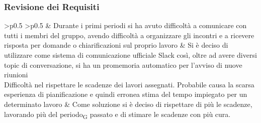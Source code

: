 \subsubsection{Revisione dei Requisiti}
\renewcommand{\arraystretch}{1.5}
\begin{longtable}{
		>{}p{}
		>{}p{}
	}
	\rowcolorhead
	\centering {} &
	\centering \headertitle{Soluzione}
	\endfirsthead
	\endhead
	Durante i primi periodi si ha avuto difficoltà a comunicare con tutti i membri del gruppo, avendo difficoltà a organizzare gli incontri e a ricevere risposta per domande o chiarificazioni sul proprio lavoro & Si è deciso di utilizzare come sistema di comunicazione ufficiale Slack così, oltre ad avere diversi topic di conversazione, si ha un promemoria automatico per l'avviso di nuove riunioni\\
	
	Difficoltà nel rispettare le scadenze dei lavori assegnati. Probabile causa la scarsa esperienza di pianificazione e quindi erronea stima del tempo impiegato per un determinato lavoro & Come soluzione si è deciso di rispettare di più le scadenze, lavorando più del periodo\textsubscript{G} passato e di stimare le scadenze con più cura.\\
	\caption{Tabella Problemi di organizzazione}
\end{longtable}

